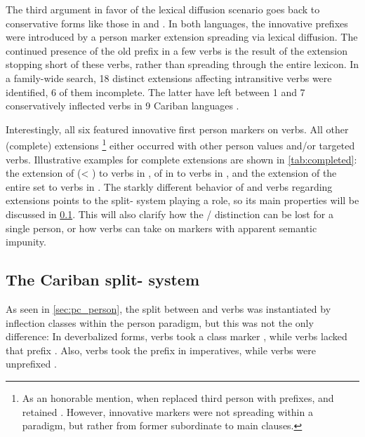 The third argument in favor of the lexical diffusion scenario goes back to conservative forms like those in \hixka and \trio.
In both languages, the innovative  prefixes were introduced by a person marker extension spreading via lexical diffusion.
The continued presence of the old  prefix in a few verbs is the result of the extension stopping short of these verbs, rather than spreading through the entire  lexicon.
In a family-wide search, 18 distinct extensions affecting intransitive verbs were identified, 6 of them incomplete.
The latter have left between 1 and 7 conservatively inflected verbs in 9 Cariban languages .

Interestingly, all six featured innovative first person markers on  verbs.
All other (complete) extensions%
\footnote{As an honorable mention, when \ikpeng replaced third person \setone with \settwo prefixes,   and   retained  \parencite[12]{matter2019arara}.
	However, innovative markers were not spreading within a paradigm, but rather from former subordinate to main clauses.} either occurred with other person values and/or targeted  verbs.
Illustrative examples for complete extensions are shown in \cref{tab:completed}: the extension of   (< ) to  verbs in \apalai {}, of   in to  verbs in \panare {}, and the extension of the entire  set to  verbs in \waimiri {}. %
The starkly different behavior of  and  verbs regarding extensions points to the split- system playing a role, so its main properties will be discussed in \cref{sec:split}.
This will also clarify how the / distinction can be lost for a single person, or how  verbs can take on  markers with apparent semantic impunity.



\subsection{The Cariban split- system}
\label{sec:split}
As seen in \cref{sec:pc_person}, the split between  and  verbs was instantiated by inflection classes within the \PC \setone person paradigm, but this was not the only difference:
In deverbalized forms,  verbs took a class marker , while  verbs lacked that prefix \parencites[89, 141--142]{gildea1998}[208]{meira2000split}.
Also,  verbs took the  prefix  in imperatives, while  verbs were unprefixed \parencites[89]{gildea1998}[208]{meira2000split}.

